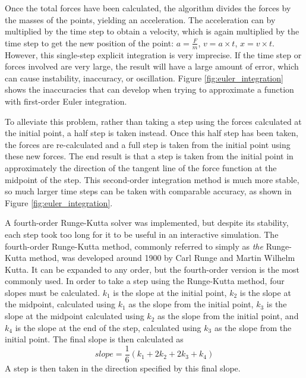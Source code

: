 \documentclass{thesis}
\begin{document}
Once the total forces have been calculated, the algorithm divides the forces by the masses of the points, yielding an acceleration.
The acceleration can by multiplied by the time step to obtain a velocity, which is again multiplied by the time step to get the new
position of the point: $a=\frac{F}{m}$, $v=a\times t$, $x=v\times t$.
However, this single-step explicit integration is very imprecise.  If the time step or forces involved are very large, the result will
have a large amount of error, which can cause instability, inaccuracy, or oscillation.  Figure \ref{fig:euler_integration} shows the
inaccuracies that can develop when trying to approximate a function with first-order Euler integration.

To alleviate this problem, rather than taking a step using the forces calculated at the initial point, a half step is taken instead.
Once this half step has been taken, the forces are re-calculated and a full step is taken from the initial point using these new forces.
The end result is that a step is taken from the initial point in approximately the direction of the tangent line of the force function at
the midpoint of the step. This second-order integration method is much more stable, so much larger time steps can be taken with comparable
accuracy, as shown in Figure \ref{fig:euler_integration}.

A fourth-order Runge-Kutta solver was implemented, but despite its stability, each step took too long for it to be useful in an interactive
simulation.  The fourth-order Runge-Kutta method, commonly referred to simply as \emph{the} Runge-Kutta method, was developed around 1900
by Carl Runge and Martin Wilhelm Kutta.  It can be expanded to any order, but the fourth-order version is the most commonly used.  In order to take a step
using the Runge-Kutta method, four slopes must be calculated.  $k_1$ is the slope at the initial point, $k_2$ is the slope at the midpoint,
calculated using $k_1$ as the slope from the initial point, $k_3$ is the slope at the midpoint calculated using $k_2$ as the slope from the
initial point, and $k_4$ is the slope at the end of the step, calculated using $k_3$ as the slope from the initial point.  The final slope
is then calculated as \[slope=\frac{1}{6}(k_1+2k_2+2k_3+k_4)\]  A step is then taken in the direction specified by this final slope.
\end{document}
